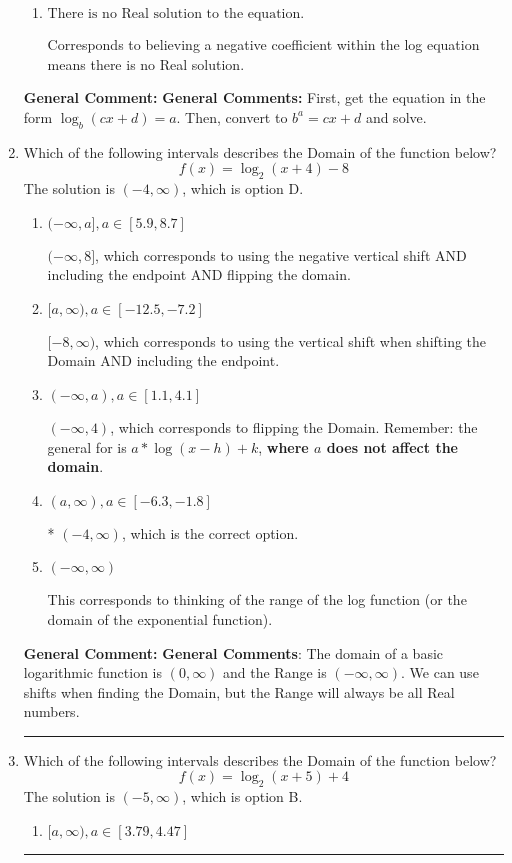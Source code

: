 \documentclass{extbook}[14pt]
\newcommand{\litem}[1]{\item #1

\rule{\textwidth}{0.4pt}}
\begin{document}
\begin{enumerate}
{\begin{enumerate}[label=\Alph*.]
* $x = 2.981$, which is the correct option.
\item \( \text{There is no Real solution to the equation.} \)

Corresponds to believing a negative coefficient within the log equation means there is no Real solution.
\end{enumerate}

\textbf{General Comment:} \textbf{General Comments:} First, get the equation in the form $\log_b{(cx+d)} = a$. Then, convert to $b^a = cx+d$ and solve.
}
\litem{
Which of the following intervals describes the Domain of the function below?
\[ f(x) = \log_2{(x+4)}-8 \]
The solution is \( (-4, \infty) \), which is option D.\begin{enumerate}[label=\Alph*.]
\item \( (-\infty, a], a \in [5.9, 8.7] \)

$(-\infty, 8]$, which corresponds to using the negative vertical shift AND including the endpoint AND flipping the domain.
\item \( [a, \infty), a \in [-12.5, -7.2] \)

$[-8, \infty)$, which corresponds to using the vertical shift when shifting the Domain AND including the endpoint.
\item \( (-\infty, a), a \in [1.1, 4.1] \)

$(-\infty, 4)$, which corresponds to flipping the Domain. Remember: the general for is $a*\log(x-h)+k$, \textbf{where $a$ does not affect the domain}.
\item \( (a, \infty), a \in [-6.3, -1.8] \)

* $(-4, \infty)$, which is the correct option.
\item \( (-\infty, \infty) \)

This corresponds to thinking of the range of the log function (or the domain of the exponential function).
\end{enumerate}

\textbf{General Comment:} \textbf{General Comments}: The domain of a basic logarithmic function is $(0, \infty)$ and the Range is $(-\infty, \infty)$. We can use shifts when finding the Domain, but the Range will always be all Real numbers.
}
\litem{
Which of the following intervals describes the Domain of the function below?
\[ f(x) = \log_2{(x+5)}+4 \]
The solution is \( (-5, \infty) \), which is option B.\begin{enumerate}[label=\Alph*.]
\item \( [a, \infty), a \in [3.79, 4.47] \)


\end{enumerate}}
\end{enumerate}
\end{document}
